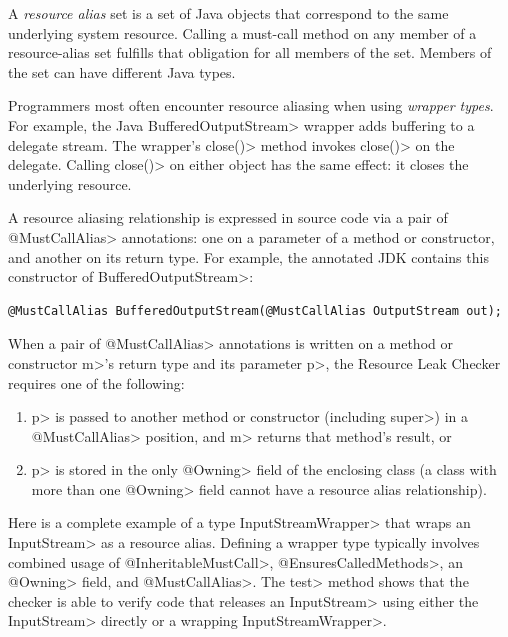 A \emph{resource alias} set is a set of Java objects that
correspond to the same underlying system resource.
Calling a must-call method on any member of a resource-alias set
fulfills that obligation for all members of the set.
Members of the set can have different Java types.

Programmers most often encounter resource aliasing when using \emph{wrapper types}.
For example, the Java \<Buffered\-Output\-Stream> wrapper adds buffering to a
delegate stream.
The wrapper's \<close()> method invokes \<close()> on the delegate.  Calling
\<close()> on either object has the same effect:  it closes the underlying resource.

A resource aliasing relationship is expressed in source code via a pair of \<@MustCallAlias> annotations:
one on a parameter of a method or constructor, and another on its return type.
For example, the annotated JDK contains this constructor of \<BufferedOutputStream>:
\begin{Verbatim}
@MustCallAlias BufferedOutputStream(@MustCallAlias OutputStream out);
\end{Verbatim}

When a pair of \<@MustCallAlias> annotations is written on a method or constructor \<m>'s return type
and its parameter \<p>, the Resource Leak Checker requires one of the following:
\begin{enumerate}
\item \<p> is passed to another method or constructor (including \<super>) in a
  \<@MustCallAlias> position, and \<m> returns that method's result, or
\item \<p> is stored in the only \<@Owning> field of the enclosing class (a class with more than one
  \<@Owning> field cannot have a resource alias relationship).
\end{enumerate}


Here is a complete example of a type \<InputStreamWrapper> that wraps an \<InputStream> as a resource alias.  Defining a wrapper type typically involves combined usage of \<@InheritableMustCall>, \<@EnsuresCalledMethods>, an \<@Owning> field, and \<@MustCallAlias>.  The \<test> method shows that the checker is able to verify code that releases an \<InputStream> using either the \<InputStream> directly or a wrapping \<InputStreamWrapper>.

